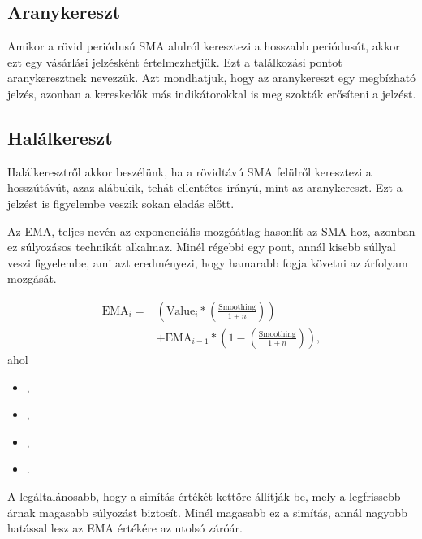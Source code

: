 \subsection{Aranykereszt}
Amikor a rövid periódusú SMA alulról keresztezi a hosszabb periódusút, akkor ezt egy vásárlási jelzésként értelmezhetjük. Ezt a találkozási pontot aranykeresztnek nevezzük. Azt mondhatjuk, hogy az aranykereszt egy megbízható jelzés, azonban a kereskedők más indikátorokkal is meg szokták erősíteni a jelzést.

\subsection{Halálkereszt}
Halálkeresztről akkor beszélünk, ha a rövidtávú SMA felülről keresztezi a hosszútávút, azaz alábukik, tehát ellentétes irányú, mint az aranykereszt. Ezt a jelzést is figyelembe veszik sokan eladás előtt.

Az EMA, teljes nevén az exponenciális mozgóátlag hasonlít az SMA-hoz, azonban ez súlyozásos technikát alkalmaz. Minél régebbi egy pont, annál kisebb súllyal veszi figyelembe, ami azt eredményezi, hogy hamarabb fogja követni az árfolyam mozgását.

\begin{align*}
\text{EMA}_{i} = &\left(\text{Value}_{i}*\left(\frac{\text{Smoothing}}{1+n}\right)\right) \\
        &+ \text{EMA}_{i-1}*\left(1-\left(\frac{\text{Smoothing}}{1+n}\right)\right),
\end{align*}
ahol

\begin{itemize}
  \setlength\itemsep{0em}
  \item[] { ,}
  \item[] { ,}
  \item[] { ,}
  \item[] { .}
\end{itemize}

\vspace*{2mm}
\noindent A legáltalánosabb, hogy a simítás értékét kettőre állítják be, mely a legfrissebb árnak magasabb súlyozást biztosít. Minél magasabb ez a simítás, annál nagyobb hatással lesz az EMA értékére az utolsó záróár.


